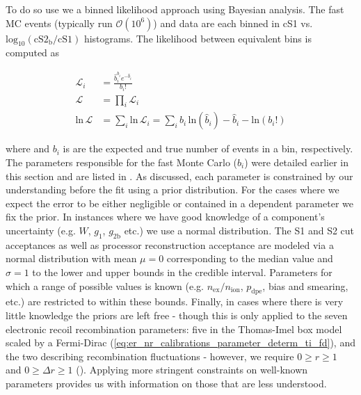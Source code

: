 To do so use we a binned likelihood approach using Bayesian analysis.  The fast MC events (typically run $\mathcal{O}(10^6)$) and data are
each binned in cS1 vs. $\mathrm{log_{10}(cS2_b / cS1)}$ histograms.  The likelihood between equivalent bins \li is computed as

\begin{equation}
\begin{aligned}
\mathcal{L}_i &=\frac{\hat{b}_{i}^{b_i} e^{-\hat{b}_{i}}}{b_{i}!} \\
\mathcal{L} &= \prod_i \mathcal{L}_i \\
\mathrm{ln}\, \mathcal{L} &= \sum_i \mathrm{ln}\, \mathcal{L}_i = \sum_i b_i\, \mathrm{ln} (\hat{b}_i) - \hat{b}_i - \mathrm{ln} (b_i !)
\end{aligned}
\end{equation}

\noindent where \bhi and $b_i$ is are the expected and true number of events in a bin, respectively.  The parameters responsible
for the fast Monte Carlo ($\hat{b}_i$) were detailed earlier in this section and are listed in
.  As discussed, each parameter is constrained by our understanding before
the fit using a prior distribution.  For the cases where we expect the error to be either negligible or contained in a dependent parameter
we fix the prior.  In instances where we have good knowledge of a component's uncertainty (e.g. $W$, $g_1$, $g_{2\mathrm{b}}$ etc.) we use
a normal
distribution.  The S1 and S2 cut acceptances as well as processor reconstruction acceptance are modeled via a normal distribution with
mean $\mu = 0$ corresponding to the median value and $\sigma = 1$ to the lower and upper bounds in the credible interval.  Parameters for
which a range of possible values is known (e.g. $n_{\mathrm{ex}} / n_{\mathrm{ion}}$, $p_{\mathrm{dpe}}$,
bias and smearing, etc.) are restricted to within these bounds.  Finally, in cases where there is very little knowledge the priors
are left free - though this is only applied to the seven electronic recoil recombination parameters: five in the Thomas-Imel box model
scaled by a Fermi-Dirac (\eqref{eq:er_nr_calibrations_parameter_determ_ti_fd}), and the two describing recombination
fluctuations - however, we require $0 \geq r \geq 1$ and $0 \geq \Delta r \geq 1$
().  Applying more stringent constraints on well-known parameters provides us
with information on those that are less understood.

